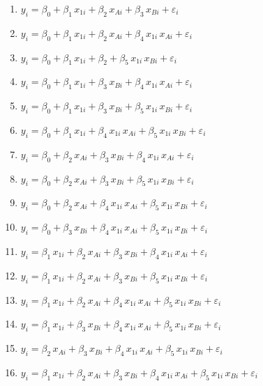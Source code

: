 \documentclass[
  letterpaper,
  DIV=11,
  numbers=noendperiod]{scrartcl}
\begin{document}
\begin{enumerate}
 
  \item $y_i = \beta_0 + \beta_1 \, x_{1i} + \beta_2 \, x_{Ai} + \beta_3 \, x_{Bi} + \varepsilon_i$
  \item $y_i = \beta_0 + \beta_1 \, x_{1i} + \beta_2 \, x_{Ai} + \beta_4 \, x_{1i} \, x_{Ai} + \varepsilon_i$
  \item $y_i = \beta_0 + \beta_1 \, x_{1i} + \beta_2 + \beta_5 \, x_{1i} \, x_{Bi} + \varepsilon_i$
  \item $y_i = \beta_0 + \beta_1 \, x_{1i} + \beta_3 \, x_{Bi} + \beta_4 \, x_{1i} \, x_{Ai} + \varepsilon_i$
  \item $y_i = \beta_0 + \beta_1 \, x_{1i} + \beta_3 \, x_{Bi} + \beta_5 \, x_{1i} \, x_{Bi} + \varepsilon_i$
  \item $y_i = \beta_0 + \beta_1 \, x_{1i} + \beta_4 \, x_{1i} \, x_{Ai} + \beta_5 \, x_{1i} \, x_{Bi} + \varepsilon_i$
  
  \item $y_i = \beta_0 + \beta_2 \, x_{Ai} + \beta_3 \, x_{Bi} + \beta_4 \, x_{1i} \, x_{Ai} + \varepsilon_i$
  \item $y_i = \beta_0 + \beta_2 \, x_{Ai} + \beta_3 \, x_{Bi} + \beta_5 \, x_{1i} \, x_{Bi} + \varepsilon_i$
  \item $y_i = \beta_0 + \beta_2 \, x_{Ai} + \beta_4 \, x_{1i} \, x_{Ai} + \beta_5 \, x_{1i} \, x_{Bi} + \varepsilon_i$
  \item $y_i = \beta_0 + \beta_3 \, x_{Bi} + \beta_4 \, x_{1i} \, x_{Ai} + \beta_5 \, x_{1i} \, x_{Bi} + \varepsilon_i$
  
  \item $y_i = \beta_1 \, x_{1i} + \beta_2 \, x_{Ai} + \beta_3 \, x_{Bi} + \beta_4 \, x_{1i} \, x_{Ai} + \varepsilon_i$
  \item $y_i = \beta_1 \, x_{1i} + \beta_2 \, x_{Ai} + \beta_3 \, x_{Bi} + \beta_5 \, x_{1i} \, x_{Bi} + \varepsilon_i$
  \item $y_i = \beta_1 \, x_{1i} + \beta_2 \, x_{Ai} + \beta_4 \, x_{1i} \, x_{Ai} + \beta_5 \, x_{1i} \, x_{Bi} + \varepsilon_i$
  \item $y_i = \beta_1 \, x_{1i} + \beta_3 \, x_{Bi} + \beta_4 \, x_{1i} \, x_{Ai} + \beta_5 \, x_{1i} \, x_{Bi} + \varepsilon_i$
  
  \item $y_i = \beta_2 \, x_{Ai} + \beta_3 \, x_{Bi} + \beta_4 \, x_{1i} \, x_{Ai} + \beta_5 \, x_{1i} \, x_{Bi} + \varepsilon_i$
  
  \item $y_i = \beta_1 \, x_{1i} + \beta_2 \, x_{Ai} + \beta_3 \, x_{Bi} + \beta_4 \, x_{1i} \, x_{Ai} + \beta_5 \, x_{1i} \, x_{Bi} + \varepsilon_i$
  

\end{enumerate}
\end{document}

